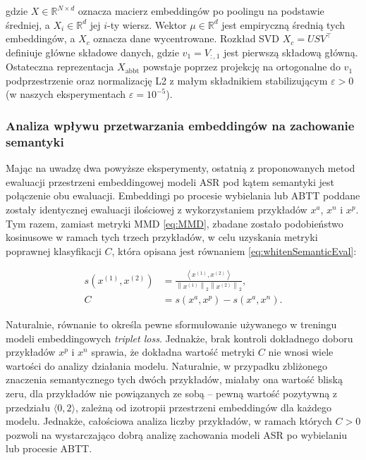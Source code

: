 gdzie $X \in \mathbb{R}^{N \times d}$ oznacza macierz embeddingów po poolingu na podstawie średniej, a $X_i \in \mathbb{R}^{d}$ jej $i$-ty wiersz. Wektor $\mu \in \mathbb{R}^{d}$ jest empiryczną średnią tych embeddingów, a $X_c$ oznacza dane wycentrowane. Rozkład SVD $X_c = U S V^\top$ definiuje główne składowe danych, gdzie $v_1 = V_{:,1}$ jest pierwszą składową główną. Ostateczna reprezentacja $X_{\mathrm{abbt}}$ powstaje poprzez projekcję na ortogonalne do $v_1$ podprzestrzenie oraz normalizację L2 z małym składnikiem stabilizującym $\varepsilon > 0$ (w naszych eksperymentach $\varepsilon = 10^{-5}$).

\subsubsection{Analiza wpływu przetwarzania embeddingów na zachowanie semantyki}
Mając na uwadzę dwa powyższe eksperymenty, ostatnią z proponowanych metod ewaluacji przestrzeni embeddingowej modeli ASR pod kątem semantyki jest połączenie obu ewaluacji. Embeddingi po procesie wybielania lub ABTT poddane zostały identycznej ewaluacji ilościowej z wykorzystaniem przykładów $x^a$, $x^n$ i $x^p$. Tym razem, zamiast metryki MMD \ref{eq:MMD}, zbadane zostało podobieństwo kosinusowe w ramach tych trzech przykładów, w celu uzyskania metryki poprawnej klasyfikacji $C$, która opisana jest równaniem \ref{eq:whitenSemanticEval}:

\begin{equation}
\label{eq:whitenSemanticEval}
\begin{aligned}
s(x^{(1)}, x^{(2)})
&=
\frac{\left\langle x^{(1)}, x^{(2)} \right\rangle}
     {\left\|x^{(1)}\right\|_2 \left\|x^{(2)}\right\|_2}, \\
C
&=
s(x^a, x^p) - s(x^a, x^n).
\end{aligned}
\end{equation}

Naturalnie, równanie to określa pewne sformułowanie używanego w treningu modeli embeddingowych \textit{triplet loss}. Jednakże, brak kontroli dokładnego doboru przykładów $x^p$ i $x^n$ sprawia, że dokładna wartość metryki $C$ nie wnosi wiele wartości do analizy działania modelu. Naturalnie, w przypadku zbliżonego znaczenia semantycznego tych dwóch przykładów, miałaby ona wartość bliską zeru, dla przykładów nie powiązanych ze sobą -- pewną wartość pozytywną z przedziału $\langle 0, 2 \rangle$, zależną od izotropii przestrzeni embeddingów dla każdego modelu. Jednakże, całościowa analiza liczby przykładów, w ramach których $C > 0$ pozwoli na wystarczająco dobrą analizę zachowania modeli ASR po wybielaniu lub procesie ABTT.

